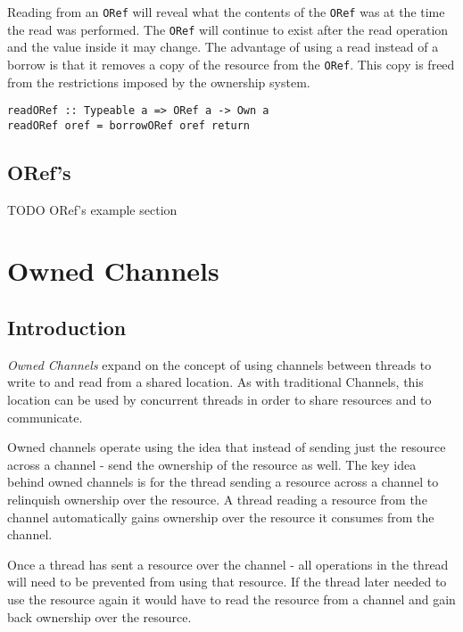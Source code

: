 \documentclass[onehalf,11pt]{beavtex}
\begin{document}
Reading from an \texttt{ORef} will reveal what the contents of the \texttt{ORef}
was at the time the read was performed.  The \texttt{ORef} will continue to
exist after the read operation and the value inside it may change.
The advantage of using a read instead of a borrow is that it removes a copy of
the resource from the \texttt{ORef}. This copy is freed from the restrictions
imposed by the ownership system.

\begin{verbatim}
readORef :: Typeable a => ORef a -> Own a
readORef oref = borrowORef oref return
\end{verbatim}


\section{ORef's}

TODO ORef's example section


\chapter{Owned Channels}

\section{Introduction}

\textit{Owned Channels} expand on the concept of using channels between threads
to write to and read from a shared location.   As with traditional Channels,
this location can be used by concurrent threads in order to share resources and
to communicate.


Owned channels operate using the idea that instead of sending just the
resource across a channel - send the ownership of the resource as well.
The key idea behind owned channels is for the thread sending a
resource across a channel to relinquish ownership over the resource.
A thread reading a resource from the channel automatically gains ownership over
the resource it consumes from the channel.

Once a thread has sent a resource over the channel - all operations in the thread
will need to be prevented from using that resource.
If the thread later needed to use the resource again it would have to read the
resource from a channel and gain back ownership over the resource.
\end{document}
